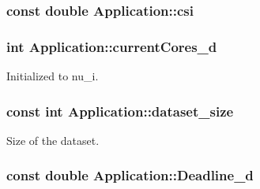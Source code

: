\hypertarget{classApplication_a7c4d5b6d8d7b2c480008dbd958872ed2}{
\subsubsection[{csi}]{\setlength{\rightskip}{0pt plus 5cm}const double Application\-::csi\hspace{0.3cm}{\ttfamily [private]}}}\label{classApplication_a7c4d5b6d8d7b2c480008dbd958872ed2}
\hypertarget{classApplication_adee341a84a5389dfd4d16e7f8e697190}{
\subsubsection[{current\-Cores\-\_\-d}]{\setlength{\rightskip}{0pt plus 5cm}int Application\-::current\-Cores\-\_\-d\hspace{0.3cm}{\ttfamily [private]}}}\label{classApplication_adee341a84a5389dfd4d16e7f8e697190}


Initialized to nu\-\_\-i. 

\hypertarget{classApplication_a83bcec93383a2816d9bbaa51b7dfa0c6}{
\subsubsection[{dataset\-\_\-size}]{\setlength{\rightskip}{0pt plus 5cm}const int Application\-::dataset\-\_\-size\hspace{0.3cm}{\ttfamily [private]}}}\label{classApplication_a83bcec93383a2816d9bbaa51b7dfa0c6}


Size of the dataset. 

\hypertarget{classApplication_ae90c165056428718e7341999781a3963}{
\subsubsection[{Deadline\-\_\-d}]{\setlength{\rightskip}{0pt plus 5cm}const double Application\-::\-Deadline\-\_\-d\hspace{0.3cm}{\ttfamily [private]}}}\label{classApplication_ae90c165056428718e7341999781a3963}


